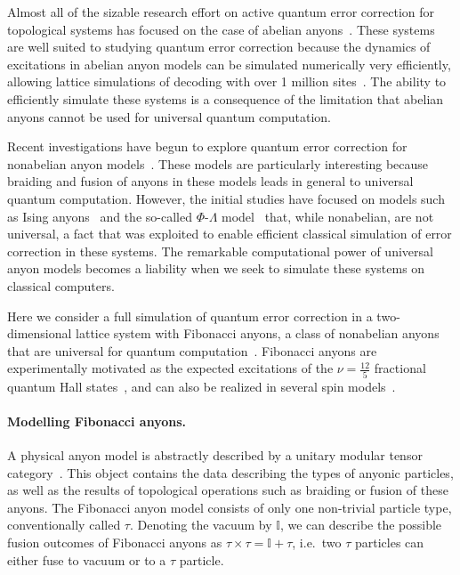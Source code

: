 \documentclass[aps, prl, letterpaper, twocolumn, superscriptaddress, notitlepage]{revtex4-1}
\begin{document}
Almost all of the sizable research effort on active quantum error correction for topological 
systems has focused on the case of abelian anyons~\cite{Terhal2014}. These systems are 
well suited to studying quantum error correction because the dynamics of excitations in 
abelian anyon models can be simulated numerically very efficiently, allowing lattice 
simulations of decoding with over 1 million sites~\cite{Duclos-Cianci2010}. The ability to 
efficiently simulate these systems is a consequence of the limitation that abelian anyons 
cannot be used for universal quantum computation. 

Recent investigations have begun to explore quantum error correction for nonabelian anyon 
models~\cite{Brell2013, Wootton2013, Hutter2014}. These models are particularly interesting 
because braiding and fusion of anyons in these models leads in general to universal quantum 
computation. However, the initial studies have focused on models such as Ising 
anyons~\cite{Brell2013} and the so-called $\Phi$-$\Lambda$ 
model~\cite{Wootton2013, Hutter2014} that, while nonabelian, are not universal, a fact 
that was exploited to enable efficient classical simulation of error correction in these systems. 
The remarkable computational power of universal anyon models becomes a liability when we 
seek to simulate these systems on classical computers. 

Here we consider a full simulation of quantum error correction in a two-dimensional lattice 
system with Fibonacci anyons, a class of nonabelian anyons that are universal for quantum 
computation~\cite{Wang2010b}. Fibonacci anyons are experimentally motivated as the 
expected excitations of the $\nu=\frac{12}{5}$ fractional quantum Hall 
states~\cite{Slingerland2001}, and can also be realized in several spin 
models~\cite{Levin2005, Kapit2013, Palumbo2014}. 


\paragraph{Modelling Fibonacci anyons.}

A physical anyon model is abstractly described by a unitary modular tensor 
category~\cite{Wang2010b}. This object contains the data describing the types of anyonic 
particles, as well as the results of topological operations such as braiding or fusion of these 
anyons. The Fibonacci anyon model consists of only one non-trivial particle type, 
conventionally called $\tau$. Denoting the vacuum by $\mathbb{I}$, we can describe the 
possible fusion outcomes of Fibonacci anyons as $\tau\times\tau=\mathbb{I}+\tau$, i.e.~two 
$\tau$ particles can either fuse to vacuum or to a $\tau$ particle.
\end{document}
